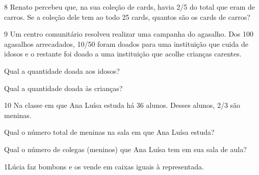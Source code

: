 
\pagebreak
\num{8} Renato percebeu que, na sua coleção de cards, havia 2/5 do total que eram de carros. Se a coleção dele tem ao todo 25 cards,
quantos são os cards de carros?


\bigskip
\bigskip
\bigskip

\num{9} Um centro comunitário resolveu realizar uma campanha do agasalho.
Dos 100 agasalhos arrecadados, 10/50 foram doados para uma instituição
que cuida de idosos e o restante foi doado a uma instituição que acolhe
crianças carentes.

\begin{escolha}
\item
  Qual a quantidade doada aos idosos?

\bigskip
\bigskip

\item
  Qual a quantidade doada às crianças?

\bigskip
\bigskip
\end{escolha}

\num{10} Na classe em que Ana Luísa estuda há 36 alunos. Desses alunos, 2/3 são meninas.

\begin{escolha}
\item
  Qual o número total de meninas na sala em que Ana Luísa estuda?

\bigskip
\bigskip

\item
  Qual o número de colegas (meninos) que Ana Luísa tem em sua sala de aula?

\bigskip
\bigskip
\end{escolha}

\pagebreak
{}

\num{1}Lúcia faz bombons e os vende em caixas iguais à representada.

